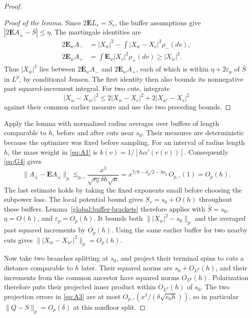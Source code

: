 \begin{proof}
\begin{proof}[Proof of the lemma]
Since \(2\mathbf EL_v=S_v\), the buffer assumptions give
\(|2\mathbf EA_\pm-\bar S|\le\eta\). The martingale identities are
\[
 \begin{split}
 2\mathbf E_w A_-&=|X_w|^2-
           \int|X_w-X_v|^2\rho_-(dv),\\
 2\mathbf E_w A_+&=\int\mathbf E_w|X_v|^2\rho_+(dv)
                      \ge |X_w|^2.
 \end{split}
\]
Thus \(|X_w|^2\) lies between \(2\mathbf E_wA_-\) and
\(2\mathbf E_wA_+\), each of which is within
\(\eta+2\varepsilon_p\) of \(\bar S\) in \(L^p\), by conditional
Jensen. The first identity then also bounds its nonnegative past
squared-increment integral. For two cuts, integrate
\[
 |X_w-X_{w'}|^2\le
       2|X_w-X_v|^2+2|X_{w'}-X_v|^2
\]
against their common earlier measure and use the two preceding bounds.
\end{proof}

Apply the lemma with normalized radius averages over buffers of length
comparable to \(h\), before and after cuts near \(s_0\). Their measures
are deterministic because the optimizer was fixed before sampling.
For an interval of radius length \(h\), the mass weight in
\eqref{eq:A1} is \(k(v)=1/[h\alpha'(r(v))]\). Consequently
\eqref{eq:G4} gives
\[
 \|A_\pm-\mathbf EA_\pm\|_p
 \lesssim_{p,\circ}\frac{x^3}{\sqrt{e_0}\delta h\sqrt\kappa}
 =x^{7/8-d_g/2-3a_g}\,O_{p,\circ}(1)=O_p(h).
\]
The last estimate holds by taking the fixed exponents small before
choosing the subpower loss. The local potential bound gives
\(S_v=s_0+O(h)\) throughout these buffers. Lemma~\ref{global:buffer-brackets}
therefore applies with \(\bar S=s_0\), \(\eta=O(h)\), and
\(\varepsilon_p=O_p(h)\). It bounds both
\(\||X_w|^2-s_0\|_p\) and the averaged past squared increments by
\(O_p(h)\). Using the same earlier buffer for two nearby cuts gives
\(\||X_w-X_{w'}|^2\|_p=O_p(h)\).

Now take two branches splitting at \(s_0\), and project their
terminal spins to cuts a distance comparable to \(h\) later.
Their squared norms are \(s_0+O_{L^p}(h)\), and their increments
from the common ancestor have squared norms \(O_{L^p}(h)\).
Polarization therefore puts their projected inner product within
\(O_{L^p}(h)\) of \(s_0\). The two projection errors in
\eqref{eq:A3} are at most
\(O_{p,\circ}(x^3/(\delta\sqrt{e_0h}))\), so in particular
\(\|Q-S\|_p=O_p(\delta)\) at this nonfloor split.


\end{proof}

